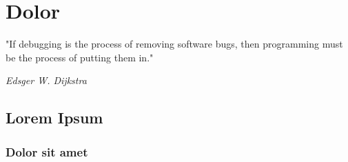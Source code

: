 \chapter{Dolor}\label{chap:dolor}

\epigraph{"If debugging is the process of removing software bugs, then programming must be the process of putting them in."}{\textit{Edsger W. Dijkstra}}

\lipsum[1]

\section{Lorem Ipsum}
\lipsum[2-4]

\subsection{Dolor sit amet}
\lipsum[5-11]